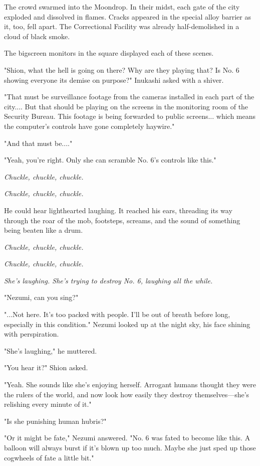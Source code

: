 The crowd swarmed into the Moondrop. In their midst, each gate of the
city exploded and dissolved in flames. Cracks appeared in the special
alloy barrier as it, too, fell apart. The Correctional Facility was
already half-demolished in a cloud of black smoke.

The bigscreen monitors in the square displayed each of these scenes.

"Shion, what the hell is going on there? Why are they playing that? Is
No. 6 showing everyone its demise on purpose?" Inukashi asked with a
shiver.

"That must be surveillance footage from the cameras installed in each
part of the city.... But that should be playing on the screens in the
monitoring room of the Security Bureau. This footage is being forwarded
to public screens... which means the computer's controls have gone
completely haywire."

"And that must be...."

"Yeah, you're right. Only she can scramble No. 6's controls like this."

\emph{Chuckle, chuckle, chuckle.}

\emph{Chuckle, chuckle, chuckle.}

He could hear lighthearted laughing. It reached his ears, threading its
way through the roar of the mob, footsteps, screams, and the sound of
something being beaten like a drum.

\emph{Chuckle, chuckle, chuckle.}

\emph{Chuckle, chuckle, chuckle.}

\myspace

\emph{She's laughing. She's trying to destroy No. 6, laughing all the while.}

"Nezumi, can you sing?"

"...Not here. It's too packed with people. I'll be out of breath before
long, especially in this condition." Nezumi looked up at the night sky,
his face shining with perspiration.

"She's laughing," he muttered.

"You hear it?" Shion asked.

"Yeah. She sounds like she's enjoying herself. Arrogant humans thought
they were the rulers of the world, and now look how easily they destroy
themselves---she's relishing every minute of it."

"Is she punishing human hubris?"

"Or it might be fate," Nezumi answered. "No. 6 was fated to become like
this. A balloon will always burst if it's blown up too much. Maybe she
just sped up those cogwheels of fate a little bit."


